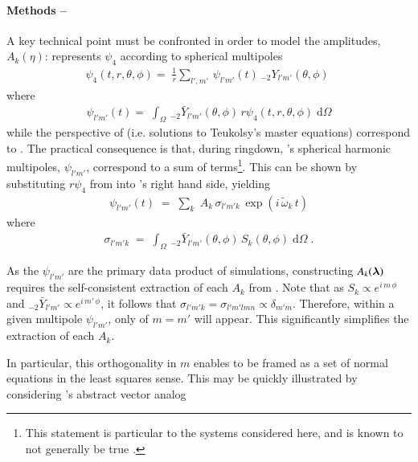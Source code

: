 \documentclass[twocolumn,prd,floatfix,preprintnumbers,a4paper,nofootinbib,superscriptaddress]{revtex4-1}
\newcommand{\cw}{\tilde{\omega}}
\begin{document}
\paragraph{Methods -- } A key technical point must be confronted in order to model the \qnm{} amplitudes, $A_{k}(\eta)$: \nr{} represents $\psi_4$ according to spherical multipoles
%
\begin{align}
	\label{eq:psi4nr}
	\psi_4(t,r,\theta,\phi) = \; \frac{1}{r} \sum_{l',m'} \, \psi_{l'm'}(t) \, _{-2}Y_{l'm'}(\theta,\phi) \;
\end{align}
%
where
%
\begin{align}
	\label{eq:psilm}
	\psi_{l'm'}(t) = \; \int_{\Omega} \, _{-2}\bar{Y}_{l'm'}(\theta,\phi) \, r\psi_4(t,r,\theta,\phi) \; \mathrm{d}\Omega
\end{align}
%
while the perspective of \pt{} (i.e. solutions to Teukolsy's master equations) correspond to .
%
The practical consequence is that, during ringdown, \nr{}'s spherical harmonic multipoles, $\psi_{l'm'}$, correspond to a sum of \qnm{} terms\footnote{This statement is particular to the systems considered here, and is known to not generally be true .}.
%
This can be shown by substituting $r\psi_4$ from  into 's right hand side, yielding
%
\begin{align}
	\label{eq:psilm_qnm_sum}
	\psi_{l'm'}(t) \; = \; \sum_{k} \; A_k \, \sigma_{l'm'k} \, \exp(i\,\cw_k\,t)
\end{align}
%
where
%
\begin{align}
	\label{eq:ysprod}
	\sigma_{l'm'k} \; = \; \int_{\Omega} \, _{-2}\bar{Y}_{l'm'}(\theta,\phi) \, S_{k}(\theta,\phi) \; \mathrm{d}\Omega \; .
\end{align}
%
\par As the $\psi_{l'm'}$ are the primary data product of \nr{} simulations, constructing $A_k({\bm{\lambda}})$ requires the self-consistent extraction of each $A_k$ from .
%
Note that as $S_k \propto e^{i\,m\,\phi}$ and $_{-2}\bar{Y}_{l'm'} \propto e^{i\,m'\,\phi}$, it follows that $\sigma_{l'm'k} = \sigma_{l'm'lmn} \propto \delta_{m'm} $.
%
Therefore, within a given \nr{} multipole $\psi_{l'm'}$, only  of $m=m'$ will appear.
%
This significantly simplifies the extraction of each $A_k$.
%
\par In particular, this orthogonality in $m$ enables  to be framed as a set of normal equations in the least squares sense.
%
This may be quickly illustrated by considering 's abstract vector analog
\end{document}
